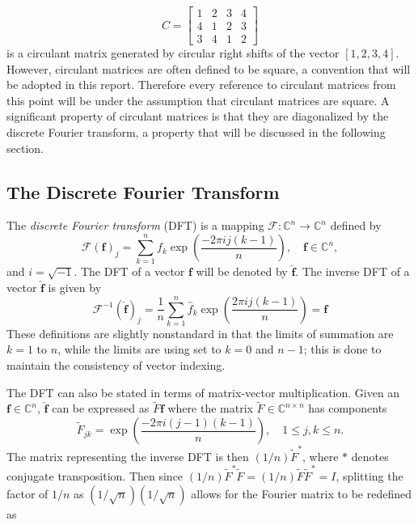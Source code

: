 \documentclass[12pt]{article}
\newcommand{\ctrans}{*}	%
\begin{document}
\[C = \begin{bmatrix}
1 & 2 & 3 & 4 \\
4 & 1 & 2 & 3 \\
3 & 4 & 1 & 2
\end{bmatrix}\] 
is a circulant matrix generated by circular right shifts of the vector $[1,2,3,4]$. However, circulant matrices are often defined to be square, a convention that will be adopted in this report. Therefore every reference to circulant matrices from this point will be under the assumption that circulant matrices are square. A significant property of circulant matrices is that they are diagonalized by the discrete Fourier transform, a property that will be discussed in the following section.

\subsection{The Discrete Fourier Transform} \label{The Discrete Fourier Transform}
The \textit{discrete Fourier transform} (DFT) is a mapping $\mathcal{F}:\mathbb{C}^n \rightarrow \mathbb{C}^n$ defined by
\begin{equation}
\mathcal{F}(\mathbf{f})_j = \sum_{k=1}^{n} f_{k}\exp\left(\frac{-2\pi{ij}(k-1)}{n}\right), \quad \mathbf{f}\in\mathbb{C}^n,
\label{Eq_DFT}
\end{equation}
and $i = \sqrt{-1}$. The DFT of a vector $\mathbf{f}$ will be denoted by $\widehat{\mathbf{f}}$. The inverse DFT of a vector $\widehat{\mathbf{f}}$ is given by
\begin{equation}
\mathcal{F}^{-1}(\widehat{\mathbf{f}})_j = \frac{1}{n}\sum_{k=1}^{n} \widehat{f}_k\exp\left(\frac{2\pi{ij}(k-1)}{n}\right) = \mathbf{f}
\end{equation}
These definitions are slightly nonstandard in that the limits of summation are $k = 1$ to $n$, while the limits are using set to $k = 0$ and $n-1$; this is done to maintain the consistency of vector indexing. \par 
The DFT can also be stated in terms of matrix-vector multiplication. Given an $\mathbf{f} \in \mathbb{C}^n$, $\widehat{\mathbf{f}}$ can be expressed as $\widetilde{F}\mathbf{f}$ where the matrix $\widetilde{F}\in\mathbb{C}^{n\times{n}}$ has components
\[\widetilde{F}_{jk} = \exp\left(\frac{-2\pi{i(j-1)(k-1)}}{n}\right), \quad 1 \leq j,k \leq n.\] 
The matrix representing the inverse DFT is then $(1/n)\widetilde{F}^\ctrans$, where $\ctrans$ denotes conjugate transposition. Then since $(1/n)\widetilde{F}^\ctrans\widetilde{F} = (1/n)\widetilde{F}\widetilde{F}^\ctrans = I$, splitting the factor of $1/n$ as $(1/\sqrt{n})(1/\sqrt{n})$ allows for the Fourier matrix to be redefined as
\end{document}
